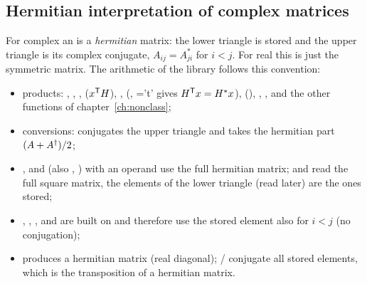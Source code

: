 \subsection{Hermitian interpretation of complex matrices}\label{sec:smat:hermitian}
For complex  an  is a \emph{hermitian} matrix: the lower triangle is stored and the
upper triangle is its complex conjugate, $A_{ij}=A_{ji}^*$ for $i<j$. For real  this is just the
symmetric matrix. The arithmetic of the library follows this convention:
\begin{itemize}
\item products: , , ,  ($x^{\mathsf T} H$),
  ,  (, ='t' gives $H^{\mathsf T} x = H^* x$),
   (), , ,  and the other
  functions of chapter~\ref{ch:nonclass};
\item conversions:  conjugates the upper triangle and
   takes the hermitian part $(A+A^{\dagger})/2$;
\item {},  and  (also \code{+}, \code{-})
  with an  operand use the full hermitian matrix;  and  read the full square matrix, the elements
  of the lower triangle (read later) are the ones stored;
\item {}, , ,  and  are built on
   and therefore use the stored element also for $i<j$ (no conjugation);
\item {} produces a hermitian matrix (real diagonal); /
  conjugate all stored elements, which is the transposition of a hermitian matrix.
\end{itemize}

